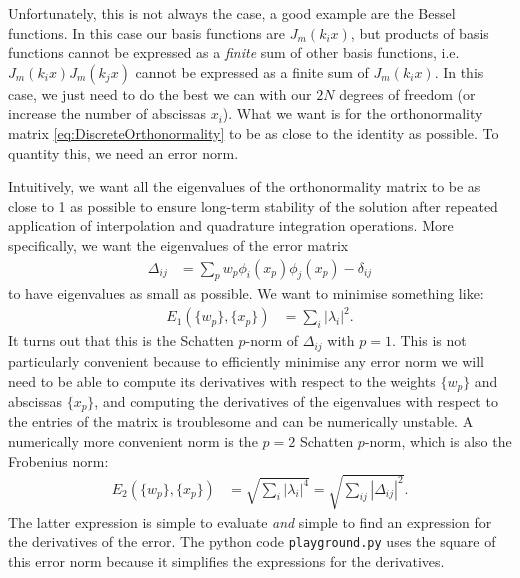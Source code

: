 \documentclass[aip,amsmath,amssymb,reprint,twocolumn]{revtex4-1}
\newcommand{\abs}[1]{\left|#1\right|}
\begin{document}
Unfortunately, this is not always the case, a good example are the Bessel functions.  In this case our basis functions are $J_m(k_i x)$, but products of basis functions cannot be expressed as a \emph{finite} sum of other basis functions, i.e.\ $J_m(k_i x) J_m(k_j x)$ cannot be expressed as a finite sum of $J_m(k_i x)$.  In this case, we just need to do the best we can with our $2N$ degrees of freedom (or increase the number of abscissas $x_i$).  What we want is for the orthonormality matrix \eqref{eq:DiscreteOrthonormality} to be as close to the identity as possible.  To quantity this, we need an error norm.

Intuitively, we want all the eigenvalues of the orthonormality matrix to be as close to 1 as possible to ensure long-term stability of the solution after repeated application of interpolation and quadrature integration operations.  More specifically, we want the eigenvalues of the error matrix
\begin{align}
  \Delta_{ij} &= \sum_p w_p \phi_i(x_p) \phi_j(x_p) - \delta_{ij}
\end{align}
to have eigenvalues as small as possible.  We want to minimise something like:
\begin{align}
  E_1(\{w_p\}, \{x_p\}) &= \sum_i \abs{\lambda_i}^2.
\end{align}
It turns out that this is the Schatten $p$-norm of $\Delta_{ij}$ with $p=1$.  This is not particularly convenient because to efficiently minimise any error norm we will need to be able to compute its derivatives with respect to the weights $\{w_p\}$ and abscissas $\{x_p\}$, and computing the derivatives of the eigenvalues with respect to the entries of the matrix is troublesome and can be numerically unstable.  A numerically more convenient norm is the $p=2$ Schatten $p$-norm, which is also the Frobenius norm:
\begin{align}
  E_2(\{w_p\}, \{x_p\}) &= \sqrt{ \sum_i \abs{\lambda_i}^4} = \sqrt{\sum_{ij} \abs{\Delta_{ij}}^2}.
\end{align}
The latter expression is simple to evaluate \emph{and} simple to find an expression for the derivatives of the error.  The python code \verb+playground.py+ uses the square of this error norm because it simplifies the expressions for the derivatives.
\end{document}
